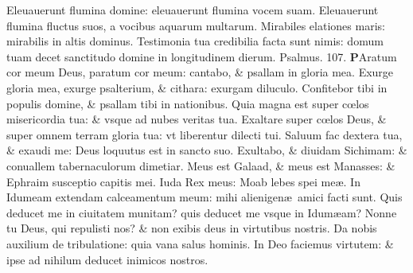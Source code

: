 \documentclass[a5paper,10pt]{book}
\def\ae{æ}
\def\oe{œ}
\begin{document}
\begin{multicols*}{2}
\newline \color{red} E\color{black}leuauerunt flumina domine: eleuauerunt flumina vocem suam.
\newline \color{red} E\color{black}leuauerunt flumina fluctus suos, a vocibus aquarum multarum.
\newline \color{red} M\color{black}irabiles elationes maris: mirabilis in altis dominus.
\newline \color{red} T\color{black}estimonia tua credibilia facta sunt nimis: domum tuam decet sanctitudo domine in longitudinem dierum.
\newline \color{red} Psalmus. 107. \color{black}
\vspace{-.25em}
\lettrine[lines=2]{\bfseries \color{red} P}{}Aratum cor meum Deus, paratum cor meum: cantabo, \& psallam in gloria mea.
\newline \color{red} E\color{black}xurge gloria mea, exurge psalterium, \& cithara: exurgam diluculo.
\newline \color{red} C\color{black}onfitebor tibi in populis domine, \& psallam tibi in nationibus.
\newline \color{red} Q\color{black}uia magna est super c\oe los misericordia tua: \& vsque ad nubes veritas tua.
\newline \color{red} E\color{black}xaltare super c\oe los Deus, \& super omnem terram gloria tua: vt liberentur dilecti tui.
\newline \color{red} S\color{black}aluum fac dextera tua, \& exaudi me: Deus loquutus est in sancto suo.
\newline \color{red} E\color{black}xultabo, \& diuidam Sichimam: \& conuallem tabernaculorum dimetiar.
\newline \color{red} M\color{black}eus est Galaad, \& meus est Manasses: \& Ephraim susceptio capitis mei.
\newline \color{red} I\color{black}uda Rex meus: Moab lebes spei me\ae .
\newline \color{red} I\color{black}n Idumeam extendam calceamentum meum: mihi alienigen\ae \ amici facti sunt.
\newline \color{red} Q\color{black}uis deducet me in ciuitatem munitam? quis deducet me vsque in Idum\ae am?
\newline \color{red} N\color{black}onne tu Deus, qui repulisti nos? \& non exibis deus in virtutibus nostris.
\newline \color{red} D\color{black}a nobis auxilium de tribulatione: quia vana salus hominis.
\newline \color{red} I\color{black}n Deo faciemus virtutem: \& ipse ad nihilum deducet inimicos nostros.

\end{multicols*}
\end{document}
